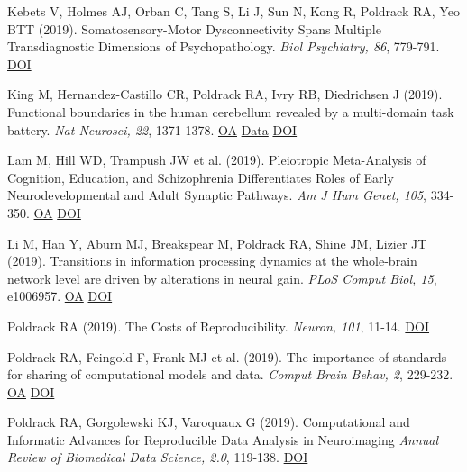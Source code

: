 \documentclass[10pt, letterpaper]{article}
\begin{document}
Kebets V, Holmes AJ, Orban C, Tang S, Li J, Sun N, Kong R, Poldrack RA, Yeo BTT (2019). Somatosensory-Motor Dysconnectivity Spans Multiple Transdiagnostic Dimensions of Psychopathology. \textit{Biol Psychiatry, 86}, 779-791. \href{http://dx.doi.org/10.1016/j.biopsych.2019.06.013}{DOI} \vspace{2mm}

King M, Hernandez-Castillo CR, Poldrack RA, Ivry RB, Diedrichsen J (2019). Functional boundaries in the human cerebellum revealed by a multi-domain task battery. \textit{Nat Neurosci, 22}, 1371-1378. \href{https://www.ncbi.nlm.nih.gov/pmc/articles/PMC8312478}{OA} \href{https://openneuro.org/datasets/ds002105/versions/1.1.0}{Data} \href{http://dx.doi.org/10.1038/s41593-019-0436-x}{DOI} \vspace{2mm}

Lam M, Hill WD, Trampush JW et al. (2019). Pleiotropic Meta-Analysis of Cognition, Education, and Schizophrenia Differentiates Roles of Early Neurodevelopmental and Adult Synaptic Pathways. \textit{Am J Hum Genet, 105}, 334-350. \href{https://www.ncbi.nlm.nih.gov/pmc/articles/PMC6699140}{OA} \href{http://dx.doi.org/10.1016/j.ajhg.2019.06.012}{DOI} \vspace{2mm}

Li M, Han Y, Aburn MJ, Breakspear M, Poldrack RA, Shine JM, Lizier JT (2019). Transitions in information processing dynamics at the whole-brain network level are driven by alterations in neural gain. \textit{PLoS Comput Biol, 15}, e1006957. \href{https://www.ncbi.nlm.nih.gov/pmc/articles/PMC6793849}{OA} \href{http://dx.doi.org/10.1371/journal.pcbi.1006957}{DOI} \vspace{2mm}

Poldrack RA (2019). The Costs of Reproducibility. \textit{Neuron, 101}, 11-14. \href{http://dx.doi.org/10.1016/j.neuron.2018.11.030}{DOI} \vspace{2mm}

Poldrack RA, Feingold F, Frank MJ et al. (2019). The importance of standards for sharing of computational models and data. \textit{Comput Brain Behav, 2}, 229-232. \href{https://www.ncbi.nlm.nih.gov/pmc/articles/PMC7241435}{OA} \href{http://dx.doi.org/10.1007/s42113-019-00062-x}{DOI} \vspace{2mm}

Poldrack RA, Gorgolewski KJ, Varoquaux G (2019). Computational and Informatic Advances for Reproducible Data Analysis in Neuroimaging \textit{Annual Review of Biomedical Data Science, 2.0}, 119-138. \href{http://dx.doi.org/10.1146/annurev-biodatasci-072018-021237}{DOI} \vspace{2mm}
\end{document}
